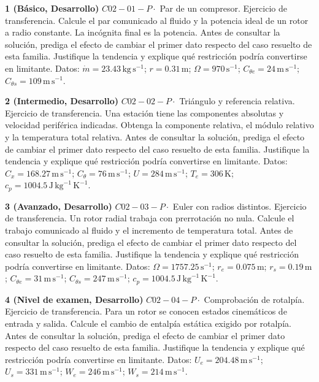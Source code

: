 \documentclass[10pt,openany]{book}
\begin{document}
\begin{tcolorbox}[title={Ejercicios propuestos}, studiumworked, breakable]

\noindent\textbf{1 (Básico, Desarrollo)}
\(C02-01-P \cdot\) Par de un compresor. Ejercicio de transferencia. Calcule el par comunicado al fluido y la potencia ideal de un rotor a radio constante. La incógnita final es la potencia. Antes de consultar la solución, prediga el efecto de cambiar el primer dato respecto del caso resuelto de esta familia. Justifique la tendencia y explique qué restricción podría convertirse en limitante. Datos: \(\dot m=23.43\, \mathrm{kg}\,\mathrm{s}^{-1}\); \(r=0.31\, \mathrm{m}\); \(\Omega=970\, \mathrm{s}^{-1}\); \(C_{\theta e}=24\, \mathrm{m}\,\mathrm{s}^{-1}\); \(C_{\theta s}=109\, \mathrm{m}\,\mathrm{s}^{-1}\).

\noindent\textbf{2 (Intermedio, Desarrollo)}
\(C02-02-P \cdot\) Triángulo y referencia relativa. Ejercicio de transferencia. Una estación tiene las componentes absolutas y velocidad periférica indicadas. Obtenga la componente relativa, el módulo relativo y la temperatura total relativa. Antes de consultar la solución, prediga el efecto de cambiar el primer dato respecto del caso resuelto de esta familia. Justifique la tendencia y explique qué restricción podría convertirse en limitante. Datos: \(C_x=168.27\, \mathrm{m}\,\mathrm{s}^{-1}\); \(C_\theta=76\, \mathrm{m}\,\mathrm{s}^{-1}\); \(U=284\, \mathrm{m}\,\mathrm{s}^{-1}\); \(T_e=306\, \mathrm{K}\); \(c_p=1004.5\, \mathrm{J}\,\mathrm{kg}^{-1}\,\mathrm{K}^{-1}\).

\noindent\textbf{3 (Avanzado, Desarrollo)}
\(C02-03-P \cdot\) Euler con radios distintos. Ejercicio de transferencia. Un rotor radial trabaja con prerrotación no nula. Calcule el trabajo comunicado al fluido y el incremento de temperatura total. Antes de consultar la solución, prediga el efecto de cambiar el primer dato respecto del caso resuelto de esta familia. Justifique la tendencia y explique qué restricción podría convertirse en limitante. Datos: \(\Omega=1757.25\, \mathrm{s}^{-1}\); \(r_e=0.075\, \mathrm{m}\); \(r_s=0.19\, \mathrm{m}\); \(C_{\theta e}=31\, \mathrm{m}\,\mathrm{s}^{-1}\); \(C_{\theta s}=247\, \mathrm{m}\,\mathrm{s}^{-1}\); \(c_p=1004.5\, \mathrm{J}\,\mathrm{kg}^{-1}\,\mathrm{K}^{-1}\).

\noindent\textbf{4 (Nivel de examen, Desarrollo)}
\(C02-04-P \cdot\) Comprobación de rotalpía. Ejercicio de transferencia. Para un rotor se conocen estados cinemáticos de entrada y salida. Calcule el cambio de entalpía estática exigido por rotalpía. Antes de consultar la solución, prediga el efecto de cambiar el primer dato respecto del caso resuelto de esta familia. Justifique la tendencia y explique qué restricción podría convertirse en limitante. Datos: \(U_e=204.48\, \mathrm{m}\,\mathrm{s}^{-1}\); \(U_s=331\, \mathrm{m}\,\mathrm{s}^{-1}\); \(W_e=246\, \mathrm{m}\,\mathrm{s}^{-1}\); \(W_s=214\, \mathrm{m}\,\mathrm{s}^{-1}\).
\end{tcolorbox}
\end{document}
